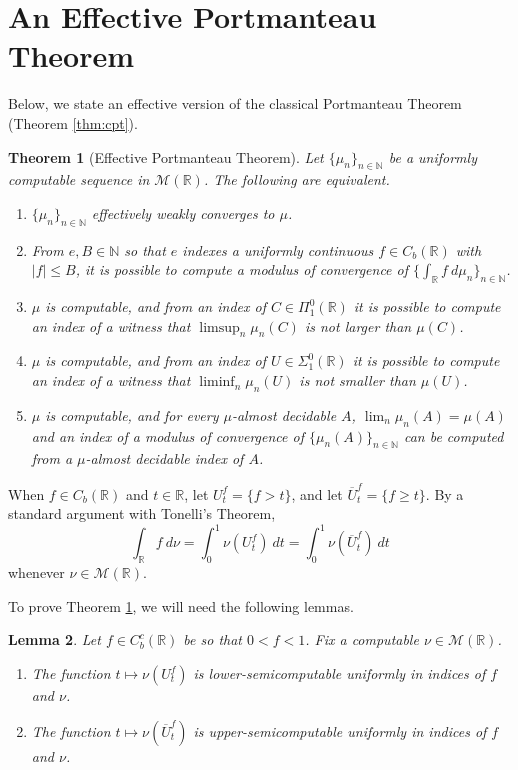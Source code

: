 \documentclass{amsart}
\newcommand{\R}{\mathbb{R}}
\newcommand{\N}{\mathbb{N}}
\newcommand{\M}{\mathcal{M}}
\newcommand{\ol}{\overline}
\newtheorem{theorem}{Theorem}[section]
\newtheorem{lemma}[theorem]{Lemma}
\theoremstyle{definition}
\numberwithin{equation}{section}
\begin{document}
\section{An Effective Portmanteau Theorem}

Below, we state an effective version of the classical Portmanteau Theorem (Theorem \ref{thm:cpt}).

\begin{theorem}[Effective Portmanteau Theorem]\label{thm:ept}
Let $\{\mu_n\}_{n\in\N}$ be a uniformly computable sequence in $\M(\R)$. The following are equivalent.
	\begin{enumerate}
   		\item $\{\mu_n\}_{n\in\N}$ effectively weakly converges to $\mu$.\label{thm:ept::ewc}
		
    		\item From $e,B \in \N$ so that $e$ indexes a uniformly continuous $f \in C_b(\R)$ with $|f| \leq B$, it is possible to compute a modulus of convergence of $\{\int_\R f\ d\mu_n\}_{n \in \N}$.\label{thm:ept::uc}
	
	    	\item $\mu$ is computable, and from an index of $C \in \Pi^0_1(\R)$ it is possible to compute an index of a 
		witness that $\limsup_n \mu_n(C)$ is not larger than $\mu(C)$.\label{thm:ept::clsd}
		
    		\item	$\mu$ is computable, and from an index of $U \in \Sigma^0_1(\R)$ it is possible to compute an index of 
		a witness that $\liminf_n \mu_n(U)$ is not smaller than $\mu(U)$.\label{thm:ept::opn}
		
    		\item $\mu$ is computable, and for every $\mu$-almost decidable $A$, $\lim_n \mu_n(A) = \mu(A)$ and an index of a modulus of convergence of $\{\mu_n(A)\}_{n \in \N}$ can be computed from a $\mu$-almost decidable index of $A$.\label{thm:ept::a.d.}
	\end{enumerate}
\end{theorem}

When $f \in C_b(\R)$ and $t \in \R$, let $U^f_t = \{f > t\}$, and let $\ol{U}^f_t = \{f \geq t\}$.  By a standard argument with Tonelli's Theorem, 
\[
\int_\R f\ d\nu = \int_0^1 \nu(U^f_t)\ dt = \int_0^1 \nu(\ol{U}^f_t)\ dt
\]
whenever $\nu \in \M(\R)$.

To prove Theorem \ref{thm:ept}, we will need the following lemmas.

\begin{lemma}\label{lm:sc.U}
Let $f\in C^c_b(\R)$ be so that $0<f<1$.  Fix a computable $\nu \in \M(\R)$.  
\begin{enumerate}
	\item The function $t \mapsto \nu(U^f_t)$ is lower-semicomputable uniformly in indices of $f$ and $\nu$. \label{lm:sc.U::lsc}
	\item The function $t \mapsto \nu(\ol{U}^f_t)$ is upper-semicomputable uniformly in indices of $f$ and $\nu$.
	\label{lm:sc.U::usc}
\end{enumerate}
\end{lemma}
\end{document}
